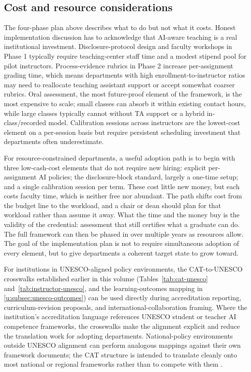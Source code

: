 \documentclass{SIAMbook2023}
\begin{document}
\subsection{Cost and resource considerations}
\label{u:subsec:cost-considerations}%
%

The four-phase plan above describes what to do but not what it costs. Honest implementation discussion has to acknowledge that AI-aware teaching is a real institutional investment. Disclosure-protocol design and faculty workshops in Phase 1 typically require teaching-center staff time and a modest stipend pool for pilot instructors. Process-evidence rubrics in Phase 2 increase per-assignment grading time, which means departments with high enrollment-to-instructor ratios may need to reallocate teaching assistant support or accept somewhat coarser rubrics. Oral assessment, the most future-proof element of the framework, is the most expensive to scale; small classes can absorb it within existing contact hours, while large classes typically cannot without TA support or a hybrid in-class/recorded model. Calibration sessions across instructors are the lowest-cost element on a per-session basis but require persistent scheduling investment that departments often underestimate.

For resource-constrained departments, a useful adoption path is to begin with three low-cash-cost elements that do not require new hiring: explicit per-assignment AI policies; the disclosure-block standard, largely a one-time setup; and a single calibration session per term. These cost little new money, but each costs faculty time, which is neither free nor abundant. The path shifts cost from the budget line to the workload, and a chair or dean should plan for that workload rather than assume it away. What the time and the money buy is the validity of the credential: assessment that still certifies what a graduate can do. The full framework can then be phased in over multiple years as resources allow. The goal of the implementation plan is not to require simultaneous adoption of every element, but to give departments a coherent target state to grow toward.

For institutions in UNESCO-aligned policy environments, the CAT-to-UNESCO crosswalks established earlier in this volume (Tables~\ref{tab:cat-unesco} and~\ref{tab:instructor-unesco}, and the learning-outcomes mapping in \cref{u:subsec:unesco-outcomes}) can be used directly during accreditation reporting, curriculum-revision proposals, and international-collaboration framing. Where the institution's accreditation language references UNESCO student or teacher AI competence frameworks, the crosswalks make the alignment explicit and reduce the translation work for adopting departments. National-policy environments outside UNESCO alignment can perform analogous mappings against their own framework documents; the CAT structure is intended to translate cleanly onto most national or regional frameworks rather than to compete with them \citep{usde2023artificial}.
\end{document}
